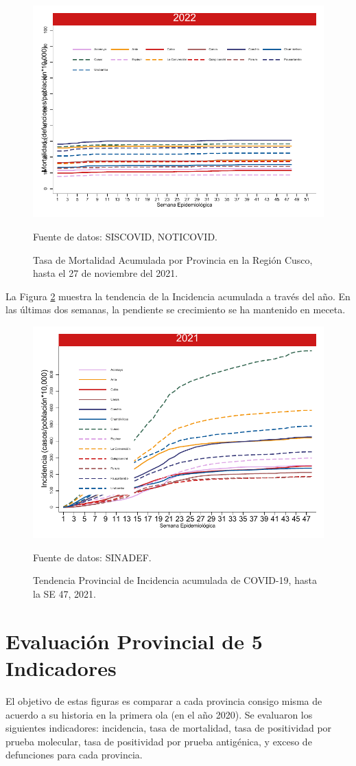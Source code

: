 \documentclass[12pt,a4paper,openany]{book}
\begin{document}
\begin{figure}[h]
	\caption{Tasa de Mortalidad Acumulada por Provincia en la Región Cusco, hasta el 27 de noviembre del 2021. }\label{fig:mortalidad_ordenada}
	\begin{center}
		\includegraphics[width=0.65\linewidth]{../figuras/mortalidad_provincial}
	\end{center}
	{\footnotesize {Fuente de datos: SISCOVID, NOTICOVID.}}
\end{figure}

La Figura \ref{fig:incidencia_provincial} muestra la tendencia de la Incidencia acumulada a través del año. En las últimas dos semanas, la pendiente se crecimiento se ha mantenido en meceta. 
%
\begin{figure}[h]
	\caption{Tendencia Provincial de Incidencia acumulada de COVID-19, hasta la SE 47, 2021. }\label{fig:incidencia_provincial}
	\begin{center}
		\includegraphics[width=0.65\linewidth]{../figuras/incidencia_provincial_2021.pdf}
	\end{center}
	{\footnotesize {Fuente de datos: SINADEF.}}
\end{figure}

\clearpage
	
\section*{Evaluación Provincial de 5 Indicadores}
		\noindent El objetivo de estas figuras es comparar a cada provincia consigo misma de acuerdo a su historia  en la primera ola (en el año 2020). Se evaluaron los siguientes indicadores: incidencia, tasa de mortalidad, tasa de positividad por prueba molecular, tasa de positividad por prueba antigénica, y exceso de defunciones para cada provincia.
		
\end{document}

